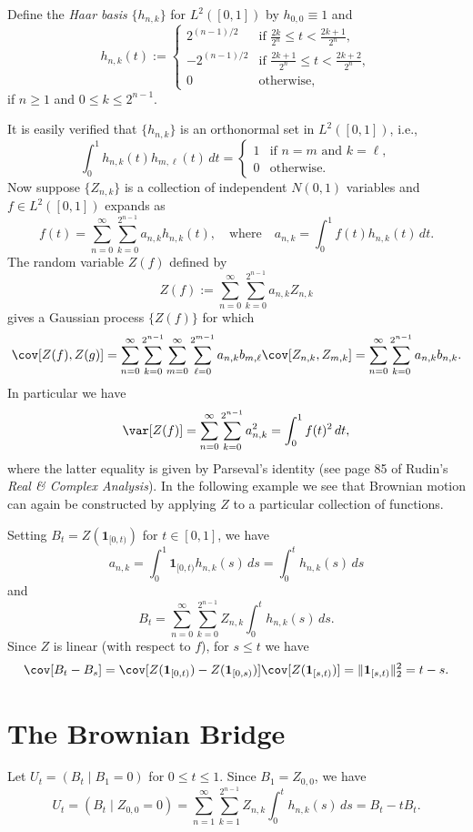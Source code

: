 \begin{defn}
Define the \emph{Haar basis} $\{h_{n,k}\}$ for $L^2([0,1])$ by $h_{0,0}\equiv 1$ and $$h_{n,k}(t):=\begin{cases}2^{(n-1)/2}&\text{if }\frac{2k}{2^n}\leq t<\frac{2k+1}{2^n},\\-2^{(n-1)/2}&\text{if }\frac{2k+1}{2^n}\leq t<\frac{2k+2}{2^n},\\0&\text{otherwise,}\end{cases}$$ if $n\geq 1$ and $0\leq k\leq 2^{n-1}$.
\end{defn}

It is easily verified that $\{h_{n,k}\}$ is an orthonormal set in $L^2([0,1])$, i.e., $$\int_0^1h_{n,k}(t)h_{m,\ell}(t)\,dt=\begin{cases}1&\text{if $n=m$ and $k=\ell$},\\0&\text{otherwise}.\end{cases}$$ Now suppose $\{Z_{n,k}\}$ is a collection of independent $N(0,1)$ variables and $f\in L^2([0,1])$ expands as $$f(t)=\sum_{n=0}^\infty\sum_{k=0}^{2^{n-1}}a_{n,k}h_{n,k}(t),\quad\text{where}\quad a_{n,k}=\int_0^1f(t)h_{n,k}(t)\,dt.$$ The random variable $Z(f)$ defined by $$Z(f):=\sum_{n=0}^\infty\sum_{k=0}^{2^{n-1}}a_{n,k}Z_{n,k}$$ gives a Gaussian process $\{Z(f)\}$ for which $$\cov[Z(f),Z(g)]=\sum_{n=0}^\infty\sum_{k=0}^{2^{n-1}}\sum_{m=0}^\infty\sum_{\ell=0}^{2^{m-1}}a_{n,k}b_{m,\ell}\cov[Z_{n,k},Z_{m,k}]=\sum_{n=0}^\infty\sum_{k=0}^{2^{n-1}}a_{n,k}b_{n,k}.$$ In particular we have $$\var[Z(f)]=\sum_{n=0}^\infty\sum_{k=0}^{2^{n-1}}a_{n,k}^2=\int_0^1f(t)^2\,dt,$$ where the latter equality is given by Parseval's identity (see page 85 of Rudin's \emph{Real \& Complex Analysis}). In the following example we see that Brownian motion can again be constructed by applying $Z$ to a particular collection of functions.
 
\begin{exmp}
Setting $B_t=Z(\mathbf{1}_{[0,t)})$ for $t\in[0,1]$, we have $$a_{n,k}=\int_0^1\mathbf{1}_{[0,t)}h_{n,k}(s)\,ds=\int_0^th_{n,k}(s)\,ds$$ and $$B_t=\sum_{n=0}^\infty\sum_{k=0}^{2^{n-1}}Z_{n,k}\int_0^th_{n,k}(s)\,ds.$$ Since $Z$ is linear (with respect to $f$), for $s\leq t$ we have $$\cov[B_t-B_s]=\cov[Z(\mathbf{1}_{[0,t)})-Z(\mathbf{1}_{[0,s)})]\cov[Z(\mathbf{1}_{[s,t)})]=\|\mathbf{1}_{[s,t)}\|_2^2=t-s.$$
\end{exmp}

\section{The Brownian Bridge}
Let $U_t=(B_t\mid B_1=0)$ for $0\leq t\leq 1$. Since $B_1=Z_{0,0}$, we have $$U_t=(B_t\mid Z_{0,0}=0)=\sum_{n=1}^\infty\sum_{k=1}^{2^{n-1}}Z_{n,k}\int_0^th_{n,k}(s)\,ds=B_t-tB_t.$$

